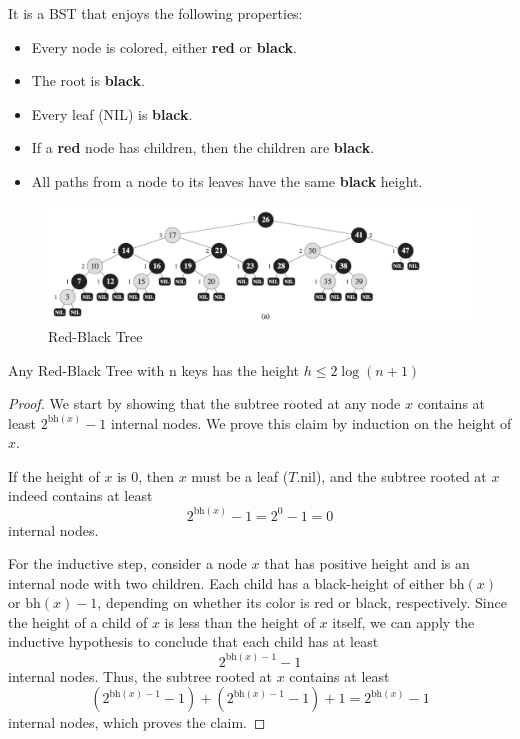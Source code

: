 It is a BST that enjoys the following properties:
\begin{itemize}
    \item Every node is colored, either \textbf{red} or \textbf{black}.
    \item The root is \textbf{black}.
    \item Every leaf (NIL) is \textbf{black}.
    \item If a \textbf{red} node has children, then the children are \textbf{black}.
    \item All paths from a node to its leaves have the same \textbf{black} height.
\end{itemize}

\begin{figure}[H]
    \centering 
    \includegraphics[width = \textwidth]{assets/RBT.png}
    \caption{Red-Black Tree}
\end{figure}

\newtheorem{RBT}{theorem}
\begin{theorem}
    Any Red-Black Tree with n keys has the height $h \leq 2\log(n+1)$
\end{theorem}
\begin{proof}
    We start by showing that the subtree rooted at any node \(x\) contains at least \(2^{\text{bh}(x)} - 1\) internal nodes. We prove this claim by induction on the height of \(x\).

    If the height of \(x\) is \(0\), then \(x\) must be a leaf (\(T.\text{nil}\)), and the subtree rooted at \(x\) indeed contains at least 
    \[
    2^{\text{bh}(x)} - 1 = 2^0 - 1 = 0
    \]
    internal nodes.

    For the inductive step, consider a node \(x\) that has positive height and is an internal node with two children. Each child has a black-height of either \(\text{bh}(x)\) or \(\text{bh}(x) - 1\), depending on whether its color is red or black, respectively. Since the height of a child of \(x\) is less than the height of \(x\) itself, we can apply the inductive hypothesis to conclude that each child has at least 
    \[
    2^{\text{bh}(x)-1} - 1
    \] 
    internal nodes. Thus, the subtree rooted at \(x\) contains at least 
    \[
    \left(2^{\text{bh}(x)-1} - 1\right) + \left(2^{\text{bh}(x)-1} - 1\right) + 1 = 2^{\text{bh}(x)} - 1
    \] 
    internal nodes, which proves the claim.
\end{proof}

